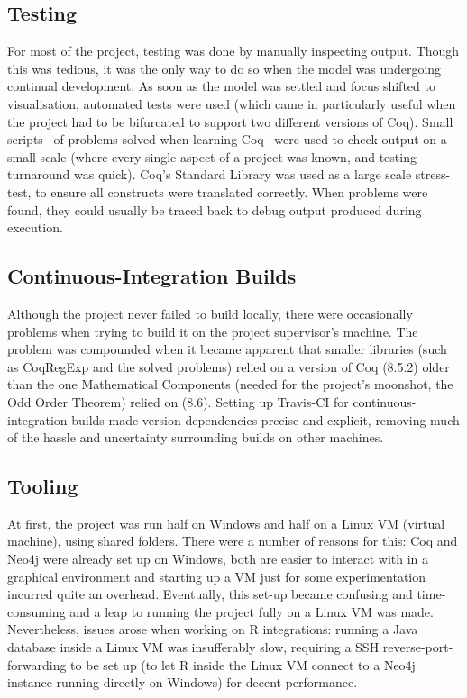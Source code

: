 \subsection{Testing}

For most of the project, testing was done by manually inspecting output. Though
this was tedious, it was the only way to do so when the model was undergoing
continual development. As soon as the model was settled and focus shifted to
visualisation, automated tests were used (which came in particularly useful when
the project had to be bifurcated to support two different versions of Coq).
Small scripts \textendash~of problems solved when learning Coq \textendash~were
used to check output on a small scale (where every single aspect of a project
was known, and testing turnaround was quick). Coq's Standard Library was used as
a large scale stress-test, to ensure all constructs were translated correctly.
When problems were found, they could usually be traced back to debug output
produced during execution.

\subsection{Continuous-Integration Builds}

Although the project never failed to build locally, there were occasionally
problems when trying to build it on the project supervisor's machine. The
problem was compounded when it became apparent that smaller libraries (such as
CoqRegExp and the solved problems) relied on a version of Coq (8.5.2) older than
the one Mathematical Components (needed for the project's moonshot, the Odd
Order Theorem) relied on (8.6). Setting up Travis-CI for continuous-integration
builds made version dependencies precise and explicit, removing much of the
hassle and uncertainty surrounding builds on other machines.

\subsection{Tooling}

At first, the project was run half on Windows and half on a Linux VM (virtual
machine), using shared folders. There were a number of reasons for this: Coq
and Neo4j were already set up on Windows, both are easier to interact with in a
graphical environment and starting up a VM just for some experimentation
incurred quite an overhead.  Eventually, this set-up became confusing and
time-consuming and a leap to running the project fully on a Linux VM was made.
Nevertheless, issues arose when working on R integrations: running a Java
database inside a Linux VM was insufferably slow, requiring a SSH
reverse-port-forwarding to be set up (to let R inside the Linux VM connect to
a Neo4j instance running directly on Windows) for decent performance.


